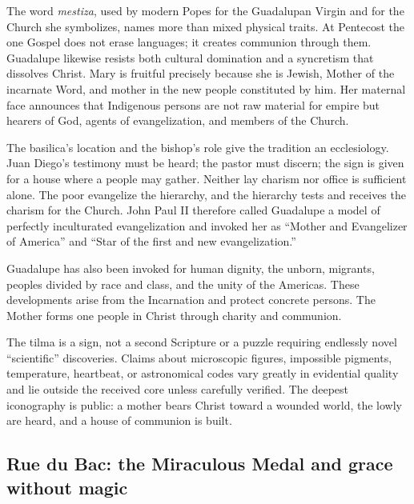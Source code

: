 The word \emph{mestiza}, used by modern Popes for the Guadalupan Virgin and for the Church she symbolizes, names more than mixed physical traits. At Pentecost the one Gospel does not erase languages; it creates communion through them. Guadalupe likewise resists both cultural domination and a syncretism that dissolves Christ. Mary is fruitful precisely because she is Jewish, Mother of the incarnate Word, and mother in the new people constituted by him. Her maternal face announces that Indigenous persons are not raw material for empire but hearers of God, agents of evangelization, and members of the Church.

The basilica's location and the bishop's role give the tradition an ecclesiology. Juan Diego's testimony must be heard; the pastor must discern; the sign is given for a house where a people may gather. Neither lay charism nor office is sufficient alone. The poor evangelize the hierarchy, and the hierarchy tests and receives the charism for the Church. John Paul II therefore called Guadalupe a model of perfectly inculturated evangelization and invoked her as ``Mother and Evangelizer of America'' and ``Star of the first and new evangelization.''

Guadalupe has also been invoked for human dignity, the unborn, migrants, peoples divided by race and class, and the unity of the Americas. These developments arise from the Incarnation and protect concrete persons. The Mother forms one people in Christ through charity and communion.

\enlargethispage{\baselineskip}
The tilma is a sign, not a second Scripture or a puzzle requiring endlessly novel ``scientific'' discoveries. Claims about microscopic figures, impossible pigments, temperature, heartbeat, or astronomical codes vary greatly in evidential quality and lie outside the received core unless carefully verified. The deepest iconography is public: a mother bears Christ toward a wounded world, the lowly are heard, and a house of communion is built.

\subsection{Rue du Bac: the Miraculous Medal and grace without magic}


